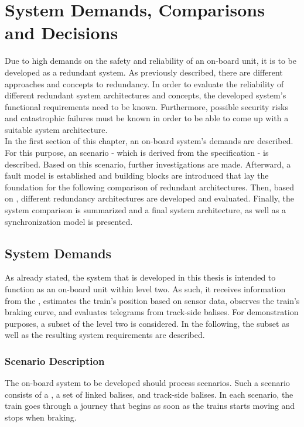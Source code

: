 \chapter{System Demands, Comparisons and Decisions}
\label{chptr:redundantSystemsCompare}
Due to high demands on the safety and reliability of an on-board unit, it is to be developed as a redundant system.
As previously described, there are different approaches and concepts to redundancy.
In order to evaluate the reliability of different redundant system architectures and concepts, the developed system's functional requirements need to be known.
Furthermore, possible security risks and catastrophic failures must be known in order to be able to come up with a suitable system architecture.
\\

In the first section of this chapter, an  on-board system's demands are described.
For this purpose, an  scenario - which is derived from the  specification - is described.
Based on this scenario, further investigations are made.
Afterward, a fault model is established and  building blocks are introduced that lay the foundation for the following comparison of redundant architectures.
Then, based on , different redundancy architectures are developed and evaluated.
Finally, the system comparison is summarized and a final system architecture, as well as a synchronization model is presented.

\section{System Demands}
As already stated, the system that is developed in this thesis is intended to function as an on-board unit within  level two.
As such, it receives information from the , estimates the train's position based on sensor data, observes the train's braking curve, and evaluates telegrams from track-side balises.
For demonstration purposes, a subset of the  level two is considered.
In the following, the  subset as well as the resulting system requirements are described.

\subsection{Scenario Description}
\label{sec:ScenarioDescription}

The on-board system to be developed should process  scenarios.
Such a scenario consists of a , a set of linked balises, and track-side balises.
In each scenario, the train goes through a journey that begins as soon as the trains starts moving and stops when braking.
\\


